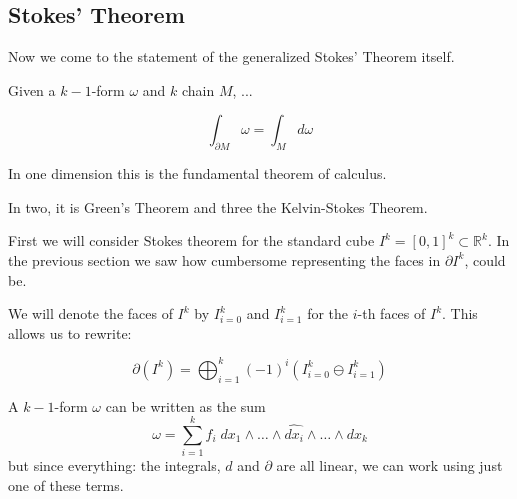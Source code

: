 %
%
\subsection{Stokes' Theorem}

Now we come to the statement of the generalized Stokes' Theorem itself.

Given a $k-1$-form $\omega$ and $k$ chain $M$, ...

\begin{equation}
	\int_{\partial M} \omega = \int_M d\omega
\end{equation}


In one dimension this is the fundamental theorem of calculus.

In two, it is Green's Theorem and three the Kelvin-Stokes Theorem.


First we will consider Stokes theorem for the standard cube $I^k = [0,1]^k \subset \mathbb{R}^k$.
In the previous section we saw how cumbersome representing the faces in $\partial I^k$, could be.

We will denote the faces of $I^k$ by $I^k_{i=0}$ and $I^k_{i=1}$ for the $i$-th faces of $I^k$.
This allows us to rewrite:

\begin{equation}
	\partial (I^k) = \bigoplus_{i=1}^k (-1)^i \left( I^k_{i=0} \ominus I^k_{i=1} \right) 
\end{equation}

A $k-1$-form $\omega$ can be written as the sum
\begin{equation}
	\omega = \sum_{i=1}^k f_i \; dx_1 \wedge \ldots \wedge \widehat{dx_i} \wedge  \ldots \wedge dx_k
\end{equation}
but since everything: the integrals, $d$ and $\partial$ are all linear, we can work using just one of these terms.

